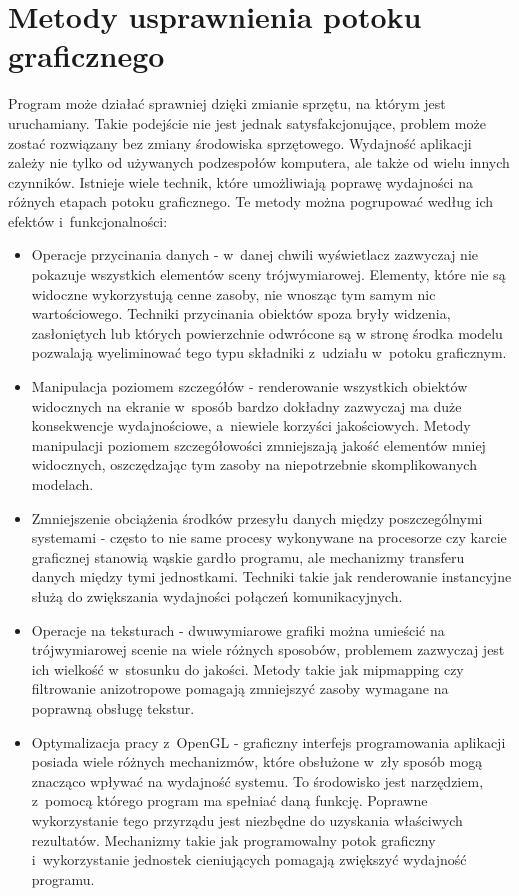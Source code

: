 \documentclass[a4paper,twoside,12pt]{book}
\begin{document}
\section{Metody usprawnienia potoku graficznego}
Program może działać sprawniej dzięki zmianie sprzętu, na którym jest uruchamiany. Takie podejście nie jest jednak satysfakcjonujące, problem może zostać rozwiązany bez zmiany środowiska sprzętowego. Wydajność aplikacji zależy nie tylko od używanych podzespołów komputera, ale także od wielu innych czynników. Istnieje wiele technik, które umożliwiają poprawę wydajności na różnych etapach potoku graficznego. Te metody można pogrupować według ich efektów i~funkcjonalności:
\begin{itemize}
    \item Operacje przycinania danych \cite{backface_culling} \cite{game_programming_gems5} \cite{ogl_guide} - w~danej chwili wyświetlacz zazwyczaj nie pokazuje wszystkich elementów sceny trójwymiarowej. Elementy, które nie są widoczne wykorzystują cenne zasoby, nie wnosząc tym samym nic wartościowego. Techniki przycinania obiektów spoza bryły widzenia, zasłoniętych lub których powierzchnie odwrócone są w stronę środka modelu pozwalają wyeliminować tego typu składniki z~udziału w~potoku graficznym.
    \item Manipulacja poziomem szczegółów \cite{lod} \cite{lod1} \cite{lod2} \cite{lod3} \cite{lod4} \cite{bib:hoppe} - renderowanie wszystkich obiektów widocznych na ekranie w~sposób bardzo dokładny zazwyczaj ma duże konsekwencje wydajnościowe, a~niewiele korzyści jakościowych. Metody manipulacji poziomem szczegółowości zmniejszają jakość elementów mniej widocznych, oszczędzając tym zasoby na niepotrzebnie skomplikowanych modelach.
    \item Zmniejszenie obciążenia środków przesyłu danych między poszczególnymi systemami \cite{ogl_guide} \cite{bib:opengl_insights} - często to nie same procesy wykonywane na procesorze czy karcie graficznej stanowią wąskie gardło programu, ale mechanizmy transferu danych między tymi jednostkami. Techniki takie jak renderowanie instancyjne służą do zwiększania wydajności połączeń komunikacyjnych.
    \item Operacje na teksturach \cite{bib:superbible} - dwuwymiarowe grafiki można umieścić na trójwymiarowej scenie na wiele różnych sposobów, problemem zazwyczaj jest ich wielkość w~stosunku do jakości. Metody takie jak mipmapping czy filtrowanie anizotropowe pomagają zmniejszyć zasoby wymagane na poprawną obsługę tekstur.
    \item Optymalizacja pracy z~OpenGL \cite{ogl_guide} \cite{bib:superbible} - graficzny interfejs programowania aplikacji posiada wiele różnych mechanizmów, które obsłużone w~zły sposób mogą znacząco wpływać na wydajność systemu. To środowisko jest narzędziem, z~pomocą którego program ma spełniać daną funkcję. Poprawne wykorzystanie tego przyrządu jest niezbędne do uzyskania właściwych rezultatów. Mechanizmy takie jak programowalny potok graficzny i~wykorzystanie jednostek cieniujących pomagają zwiększyć wydajność programu.

\end{itemize}
\end{document}
